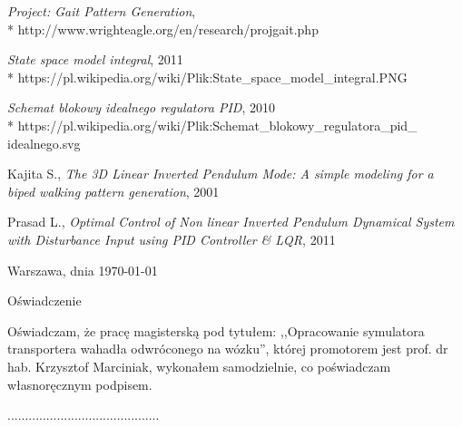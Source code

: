 \documentclass[12pt, oneside]{report}
\theoremstyle{definition}
\begin{document}
\begin{thebibliography}{11}
  \emph{Project: Gait Pattern Generation},
\\*
http://www.wrighteagle.org/en/research/projgait.php

 \emph{State space model integral}, 2011
\\*
https://pl.wikipedia.org/wiki/Plik:State\_space\_model\_integral.PNG

 \emph{Schemat blokowy idealnego regulatora PID}, 2010
\\*
https://pl.wikipedia.org/wiki/Plik:Schemat\_blokowy\_regulatora\_pid\_\\idealnego.svg

 Kajita S., \emph{The 3D Linear Inverted Pendulum Mode: A simple modeling for a biped walking pattern generation}, 2001

 Prasad L., \emph{Optimal Control of Non linear Inverted Pendulum Dynamical System with Disturbance Input using PID Controller \& LQR}, 2011

\end{thebibliography}


\clearpage
\pagestyle{empty}
\noindent Warszawa, dnia \today
\vspace{5cm}
\begin{center}
	\LARGE{Oświadczenie}
\end{center}
Oświadczam, że pracę magisterską pod tytułem: ,,Opracowanie symulatora transportera wahadła odwróconego na wózku'', której promotorem jest prof. dr hab. Krzysztof Marciniak, wykonałem samodzielnie, co poświadczam własnoręcznym podpisem.
\vspace{2cm}
\begin{flushright}
...........................................
\end{flushright}
\end{document}
